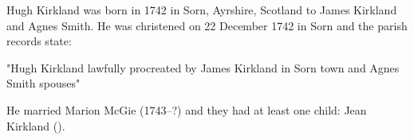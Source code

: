 
Hugh Kirkland was born in 1742 in Sorn, Ayrshire, Scotland to James Kirkland and Agnes Smith.  He was christened on
22 December 1742 in Sorn and the parish records state:

 "Hugh Kirkland lawfully procreated by James Kirkland in Sorn town and Agnes Smith spouses"\cite{HKirklandBirth}
 
 He married Marion McGie (1743--?) and they had at least one child: Jean Kirkland ().
